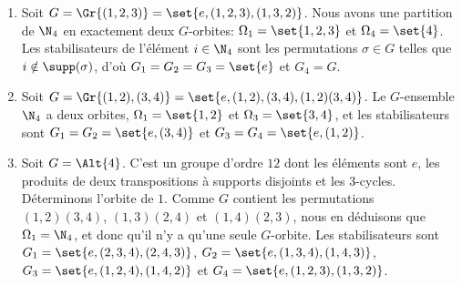 \begin{enumerate}
  \item 
    Soit $G = \Gr{(1,2,3)} = \set{e, (1,2,3), (1,3,2)}$.
    Nous avons une partition de $\N_4$ en exactement deux $G$-orbites: $\Omega_1 = \set{1,2,3}$ et $\Omega_4 = \set{4}$.
    Les stabilisateurs de l'élément $i\in\N_4$ sont les permutations $\sigma\in G$ telles que $i\notin\supp(\sigma)$, d'où $G_1 = G_2 = G_3 = \set{e}$ et $G_4 = G$.

  \item 
    Soit $G = \Gr{(1,2),(3,4)} = \set{e, (1,2),(3,4),(1,2)(3,4)}$.
    Le $G$-ensemble $\N_4$ a deux orbites, $\Omega_1 = \set{1,2}$ et $\Omega_3 = \set{3,4}$, et les stabilisateurs sont $G_1 = G_2 = \set{e,(3,4)}$ et $G_3 = G_4 = \set{e, (1,2)}$.

  \item
    Soit $G = \Alt{4}$.
    C'est un groupe d'ordre $12$ dont les éléments sont $e$, les produits de deux transpositions à supports disjoints et les $3$-cycles.
    Déterminons l'orbite de $1$.
    Comme $G$ contient les permutations $(1,2)(3,4)$, $(1,3)(2,4)$ et $(1,4)(2,3)$, nous en déduisons que  $\Omega_1 = \N_4$, et donc qu'il n'y a qu'une seule $G$-orbite.
    Les stabilisateurs sont $G_1 = \set{e, (2,3,4), (2,4,3)}$, $G_2 = \set{e, (1,3,4), (1,4,3)}$, $G_3 = \set{e, (1,2,4), (1,4,2)}$ et $G_4 = \set{e, (1,2,3), (1,3,2)}$.
\end{enumerate}
